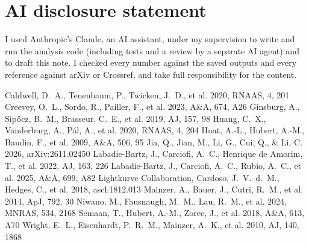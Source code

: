 \documentclass{aastex701}
\begin{document}

\section*{AI disclosure statement}
I used Anthropic's Claude, an AI assistant, under my supervision to write and run the analysis code
(including tests and a review by a separate AI agent) and to draft
this note. I checked every number against the saved outputs and every reference against arXiv or
Crossref, and take full responsibility for the content.

\begin{thebibliography}{}
 Caldwell, D.~A., Tenenbaum, P., Twicken, J.~D., et al. 2020, RNAAS, 4, 201
 Creevey, O.~L., Sordo, R., Pailler, F., et al. 2023, A\&A, 674, A26
 Ginsburg, A., Sip{\H o}cz, B.~M., Brasseur, C.~E., et al. 2019, AJ, 157, 98
 Huang, C.~X., Vanderburg, A., P\'al, A., et al. 2020, RNAAS, 4, 204
 Huat, A.-L., Hubert, A.-M., Baudin, F., et al. 2009, A\&A, 506, 95
 Jia, Q., Jian, M., Li, G., Cui, Q., \& Li, C. 2026, arXiv:2611.02450
 Labadie-Bartz, J., Carciofi, A.~C., Henrique de Amorim, T., et al. 2022, AJ, 163, 226
 Labadie-Bartz, J., Carciofi, A.~C., Rubio, A.~C., et al. 2025, A\&A, 699, A82
 Lightkurve Collaboration, Cardoso, J.~V.~d.~M., Hedges, C., et al. 2018, ascl:1812.013
 Mainzer, A., Bauer, J., Cutri, R.~M., et al. 2014, ApJ, 792, 30
 Niwano, M., Fausnaugh, M.~M., Lau, R.~M., et al. 2024, MNRAS, 534, 2168
 Semaan, T., Hubert, A.-M., Zorec, J., et al. 2018, A\&A, 613, A70
 Wright, E.~L., Eisenhardt, P.~R.~M., Mainzer, A.~K., et al. 2010, AJ, 140, 1868
\end{thebibliography}
\end{document}
